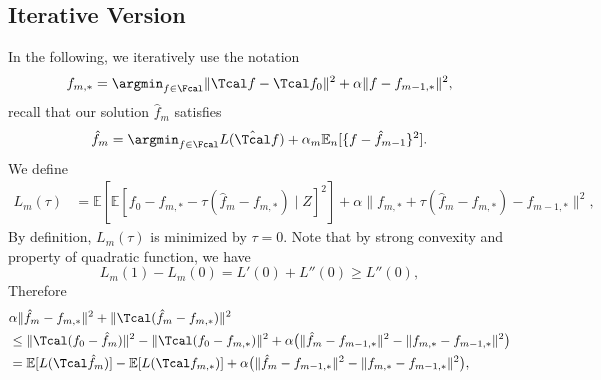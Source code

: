 \documentclass[14pt]{extarticle} %
\begin{document}
\subsection{Iterative Version}
In the following, we iteratively use the notation $$
f_{m,*} = \argmin_{f\in\Fcal} \|\Tcal f - \Tcal f_0\|^2 + \alpha \|f - f_{m-1,*}\|^2,
$$
recall that our solution $\hat{f}_{m}$ satisfies $$
\hat{f}_m = \argmin_{f\in\Fcal} L(\hat{\Tcal}f) + \alpha_m \mathbb{E}_n [\{f - \hat{f}_{m-1}\}^2].
$$
We define \begin{align*}
L_m(\tau) &= \mathbb{E}[\mathbb{E}[f_0 - f_{m,*} - \tau (\hat{f}_m - f_{m,*})\mid Z]^2]+\alpha \|f_{m,*} + \tau (\hat{f}_m - f_{m,*}) - f_{m-1,*}\|^2,
\end{align*}
By definition, $L_m(\tau)$ is minimized by $\tau = 0$. Note that by strong convexity and property of quadratic function, we have $$
L_m(1) - L_m(0) = L'(0) + L''(0) \geq L''(0),
$$
Therefore \begin{align*}
    &\alpha \|\hat{f}_m - f_{m,*}\|^2 + \|\Tcal(\hat{f}_m - f_{m,*})\|^2\\
    & \leq\|\Tcal(f_0 - \hat{f}_m)\|^2 - \|\Tcal(f_0 - f_{m,*})\|^2 + \alpha\big(\|\hat{f}_m - f_{m-1,*}\|^2 - \|f_{m,*} - f_{m-1,*}\|^2\big)\\
    & =\mathbb{E}[L(\Tcal\hat{f}_m)] - \mathbb{E}[L(\Tcal f_{m,*})]+ \alpha\big(\|\hat{f}_m - f_{m-1,*}\|^2 - \|f_{m,*} - f_{m-1,*}\|^2\big),\\
\end{align*}
\end{document}
